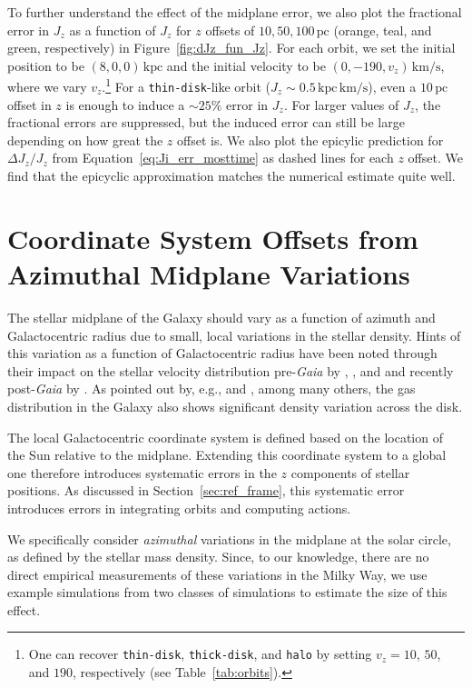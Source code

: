 \documentclass[twocolumn]{aastex62}
\newcommand{\pc}{\text{pc}}
\newcommand{\kpc}{\text{kpc}}
\newcommand{\kms}{\text{km}/\text{s}}
\newcommand{\actunit}{\text{kpc}\,\kms}
\newcommand{\thin}{\texttt{thin-disk}}
\newcommand{\thick}{\texttt{thick-disk}}
\newcommand{\halo}{\texttt{halo}}
\begin{document}
To further understand the effect of the midplane error, we also plot the
fractional error in $J_z$ as a function of $J_z$ for $z$ offsets of $10, 50,
100\,\pc$ (orange, teal, and green, respectively) in
Figure~\ref{fig:dJz_fun_Jz}. For each orbit, we set the initial position to be
$(8,0,0)\,\kpc$ and the initial velocity to be $(0, -190, v_z)\,\kms$, where
we vary $v_z$.\footnote{\label{note:vz_orbits}One can recover \thin{}, \thick{}, and \halo{} by setting $v_z=10$, $50$, and $190$, respectively (see Table~\ref{tab:orbits}).} For a \thin{}-like orbit ($J_z\sim0.5\,\actunit$), even a
$10\,\pc$ offset in $z$ is enough to induce a $\sim25\%$ error in $J_z$. For
larger values of $J_z$, the fractional errors are suppressed, but the induced
error can still be large depending on how great the $z$ offset is. We also
plot the epicylic prediction for $\Delta J_z / J_z$ from
Equation~\eqref{eq:Ji_err_mosttime} as dashed lines for each $z$ offset. We
find that the epicyclic approximation matches the numerical estimate quite
well.

\section{Coordinate System Offsets from Azimuthal Midplane Variations}
\label{sec:local_fire}

The stellar midplane of the Galaxy should vary as a function of azimuth and
Galactocentric radius due to small, local variations in the stellar density.
Hints of this variation as a function of Galactocentric radius have been noted
through their impact on the stellar velocity distribution pre-\textit{Gaia} by
\citet{2012ApJ...750L..41W}, \citet{2013ApJ...777L...5C}, and
\citet{2013MNRAS.436..101W} and recently post-\textit{Gaia} by
\citet{2019arXiv190209569F}. As pointed out by, e.g.,
\citet{2014ApJ...797...53G} and \citet{2019ApJ...871..145A}, among many
others, the gas distribution in the Galaxy also shows significant density
variation across the disk.

The local Galactocentric coordinate system is defined based on the location of
the Sun relative to the midplane. Extending this coordinate system to a global
one therefore introduces systematic errors in the $z$ components of stellar
positions. As discussed in Section~\ref{sec:ref_frame}, this systematic error
introduces errors in integrating orbits and computing actions.

We specifically consider \emph{azimuthal} variations in the midplane at the solar circle, as defined by the stellar mass density. Since, to our knowledge, there are no direct empirical measurements of these variations in the Milky Way, we use example simulations from two classes of simulations to estimate the size of this effect.
\end{document}
